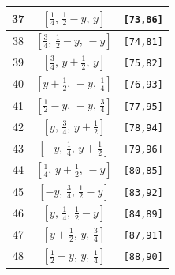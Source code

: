 \documentclass[fleqn,8pt]{jsarticle}
\begin{document}
\begin{longtable}{ccc}
37 & $\left[ \frac{1}{4},\, \frac{1}{2} - y,\, y \right]$ & {\tt [73,86]} \\ \hline
38 & $\left[ \frac{3}{4},\, \frac{1}{2} - y,\, - y \right]$ & {\tt [74,81]} \\ \hline
39 & $\left[ \frac{3}{4},\, y + \frac{1}{2},\, y \right]$ & {\tt [75,82]} \\ \hline
40 & $\left[ y + \frac{1}{2},\, - y,\, \frac{1}{4} \right]$ & {\tt [76,93]} \\ \hline
41 & $\left[ \frac{1}{2} - y,\, - y,\, \frac{3}{4} \right]$ & {\tt [77,95]} \\ \hline
42 & $\left[ y,\, \frac{3}{4},\, y + \frac{1}{2} \right]$ & {\tt [78,94]} \\ \hline
43 & $\left[ - y,\, \frac{1}{4},\, y + \frac{1}{2} \right]$ & {\tt [79,96]} \\ \hline
44 & $\left[ \frac{1}{4},\, y + \frac{1}{2},\, - y \right]$ & {\tt [80,85]} \\ \hline
45 & $\left[ - y,\, \frac{3}{4},\, \frac{1}{2} - y \right]$ & {\tt [83,92]} \\ \hline
46 & $\left[ y,\, \frac{1}{4},\, \frac{1}{2} - y \right]$ & {\tt [84,89]} \\ \hline
47 & $\left[ y + \frac{1}{2},\, y,\, \frac{3}{4} \right]$ & {\tt [87,91]} \\ \hline
48 & $\left[ \frac{1}{2} - y,\, y,\, \frac{1}{4} \right]$ & {\tt [88,90]} \\
\end{longtable}
\renewcommand{\arraystretch}{1.2}
\end{document}
